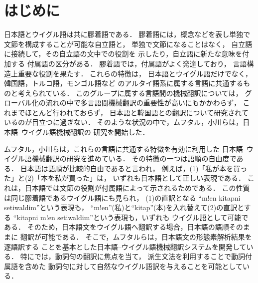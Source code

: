 

\maketitle

\section{はじめに}
日本語とウイグル語は共に膠着語である．
膠着語には，概念などを表し単独で文節を構成することが可能な自立語と，
単独で文節になることはなく，
自立語に接続して，その自立語の文中での役割を
示したり，自立語に新たな意味を付加する
付属語の区分がある．
膠着語では，付属語がよく発達しており，
言語構造上重要な役割を果たす．
これらの特徴は，
日本語とウイグル語だけでなく，韓国語，トルコ語，モンゴル語など
のアルタイ語系に属する言語に共通するものと考えられている\cite{JPORG}．
このグループに属する言語間の機械翻訳については，
グローバル化の流れの中で多言語間機械翻訳の重要性が高いにもかかわらず，
これまでほとんど行われておらず，
日本語と韓国語との翻訳について研究されているのが目立つに過ぎない．
そのような状況の中で，ムフタル，小川らは，日本語--ウイグル語機械翻訳の
研究を開始した．

ムフタル，小川らは，これらの言語に共通する特徴を有効に利用した
日本語--ウイグル語機械翻訳の研究を進めている\cite{SHURON}\cite{OGAWA2000}．
その特徴の一つは語順の自由度である．
日本語は語順が比較的自由であると言われ，
例えば，(1)「私が本を買った」と(2)「本を私が買った」は，
いずれも日本語として正しい表現である．
これは，日本語では文節の役割が付属語によって示されるためである．
この性質は同じ膠着語であるウイグル語にも見られ， 
(1)の直訳となる ``m!en kitapni setiwaldim''という表現も，
``m!en''(私)と``kitap''(本)を入れ替えて(2)の直訳とする
``kitapni m!en setiwaldim''という表現も，いずれも
ウイグル語として可能である．
そのため，日本語文をウイグル語へ翻訳する場合，日本語の語順そのままに
翻訳が可能である．
そこで，ムフタルらは，日本語文の形態素解析結果を逐語訳する
ことを基本とした日本語--ウイグル語機械翻訳システムを開発している．
特に\cite{OGAWA2000}では，動詞句の翻訳に焦点を当て，
派生文法\cite{KIYOSE1991}を利用することで動詞付属語を含めた
動詞句に対して自然なウイグル語訳を与えることを可能としている．


